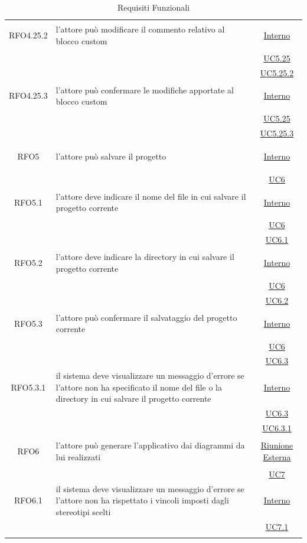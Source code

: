 \begin{longtable}{|c|>{\centering}m{7cm}|c|}
\hypertarget{RFO4.25.2}{RFO4.25.2} & l'attore può modificare il commento relativo al blocco custom &  \hyperlink{Interno}{Interno}\\
& &\hyperref[UC5.25]{UC5.25}\\
& &\hyperref[UC5.25.2]{UC5.25.2}\\ \hline

\hypertarget{RFO4.25.3}{RFO4.25.3} & l'attore può confermare le modifiche apportate al blocco custom &  \hyperlink{Interno}{Interno}\\
& &\hyperref[UC5.25]{UC5.25}\\
& &\hyperref[UC5.25.3]{UC5.25.3}\\ \hline

\hypertarget{RFO5}{RFO5} & l'attore può salvare il progetto &  \hyperlink{Interno}{Interno}\\
& & \hyperref[UC6]{UC6}\\ \hline

\hypertarget{RFO5.1}{RFO5.1} & l'attore deve indicare il nome del file in cui salvare il progetto corrente&  \hyperlink{Interno}{Interno}\\
& & \hyperref[UC6]{UC6}\\ 
& & \hyperref[UC6.1]{UC6.1}\\ \hline

\hypertarget{RFO5.2}{RFO5.2} & l'attore deve indicare la directory in cui salvare il progetto corrente&  \hyperlink{Interno}{Interno}\\
& & \hyperref[UC6]{UC6}\\ 
& & \hyperref[UC6.2]{UC6.2}\\ \hline

\hypertarget{RFO5.3}{RFO5.3} & l'attore può confermare il salvataggio del progetto corrente &  \hyperlink{Interno}{Interno}\\
& & \hyperref[UC6]{UC6}\\ 
& & \hyperref[UC6.3]{UC6.3}\\ \hline

\hypertarget{RFO5.3.1}{RFO5.3.1} & il sistema deve visualizzare un messaggio d'errore se l'attore non ha specificato il nome del file o la directory in cui salvare il progetto corrente &  \hyperlink{Interno}{Interno}\\
& & \hyperref[UC6.3]{UC6.3}\\ 
& & \hyperref[UC6.3.1]{UC6.3.1}\\ \hline

\hypertarget{RFO6}{RFO6} & l'attore può generare l'applicativo dai diagrammi da lui realizzati & \hyperlink{Riunione Esterna}{Riunione Esterna}\\
& & \hyperref[UC7]{UC7}\\ \hline

\hypertarget{RFO6.1}{RFO6.1} & il sistema deve visualizzare un messaggio d'errore se l'attore non ha rispettato i vincoli imposti dagli stereotipi scelti& \hyperlink{Interno}{Interno}\\
& & \hyperref[UC7.1]{UC7.1}\\ \hline

\caption[Requisiti Funzionali]{Requisiti Funzionali}
\label{tabella:req0}
\end{longtable}
\clearpage

